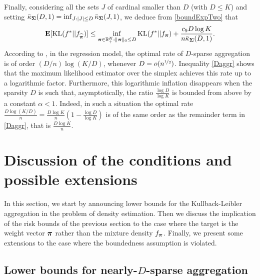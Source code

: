 Finally, considering all the sets $J$ of cardinal smaller than $D$ (with $D\le K$) and
setting $\bar\kappa_{\boldsymbol\Sigma}(D,1) = \inf_{J:|J|\le D} \bar\kappa_{\boldsymbol\Sigma}(J,1)$, we
deduce from \eqref{boundExpTwo} that
\begin{equation}
\mathbf E[{\rm KL}(f^*|| f_{\widehat{\boldsymbol \pi}})] \leq \inf_{\boldsymbol \pi\in {\mathbb B}_+^K : \|\boldsymbol \pi\|_0\le D}
{\rm KL}(f^*|| f_{\boldsymbol \pi}) + \frac{c_9 D\log K}{n\bar\kappa_{\boldsymbol\Sigma}(D,1)}.\label{Daggr}
\end{equation}
According to \citep[Theorem 5.3]{RT11}, in the regression model, the optimal
rate of $D$-sparse aggregation is of order $(D/n)\log(K/D)$, whenever $D=o(n^{\nicefrac12})$.
Inequality \eqref{Daggr} shows that the maximum likelihood estimator over the simplex
achieves this rate up to a logarithmic factor. Furthermore, this logarithmic inflation
disappears when the sparsity $D$ is such that, asymptotically, the ratio $\frac{\log D}{\log K}$
is bounded from above by a constant $\alpha<1$. Indeed, in such a situation the optimal
rate $\frac{D\log(K/D)}{n} = \frac{D\log K}{n}(1-\frac{\log D}{\log K})$ is of the same
order as the remainder term in \eqref{Daggr}, that is $\frac{D\log K}{n}$.


\section[Discussion of the results]{Discussion of the conditions and possible extensions} %
\label{sec:discussion_of_the_results}

In this section, we start by announcing lower bounds for the Kullback-Leibler aggregation
in the problem of density estimation. Then we discuss the implication of the risk bounds of the
previous section to the case where the target is the weight vector $\boldsymbol \pi$ rather than the
mixture density $f_{\boldsymbol \pi}$. Finally, we present some extensions to the case where the boundedness
assumption is violated.

\subsection[Lower bounds]{Lower bounds for nearly-$D$-sparse aggregation}
\label{ssec:lower}

